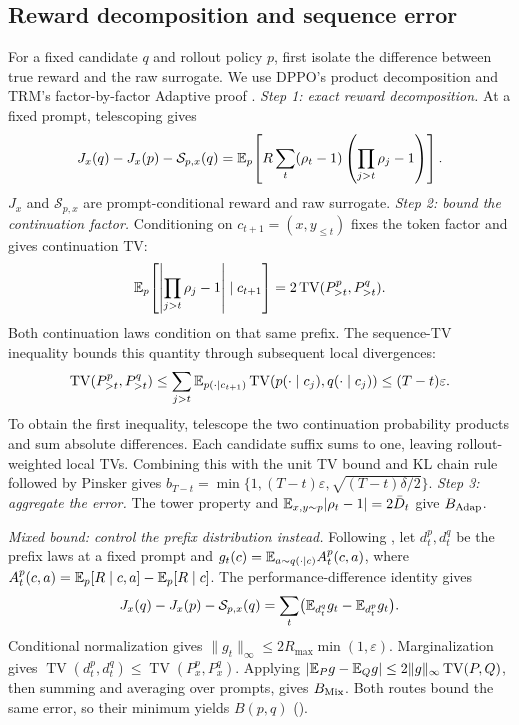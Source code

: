\subsection{Reward decomposition and sequence error}
For a fixed candidate $q$ and rollout policy $p$, first isolate the
difference between true reward and the raw surrogate. We use DPPO's product decomposition
\citep[Appendix~B.1--B.2]{qi2026rethinkingtrustregionllm} and TRM's
factor-by-factor Adaptive proof \citep[Appendix~D]{li2025trm}.
\emph{Step 1: exact reward decomposition.} At a fixed prompt, telescoping gives
\[
 J_x(q)-J_x(p)-\mathcal S_{p,x}(q)
 =\mathbb{E}_p\!\left[R\sum_t(\rho_t-1)
                      \left(\prod_{j>t}\rho_j-1\right)\right].
\]
$J_x$ and $\mathcal S_{p,x}$ are prompt-conditional reward and raw surrogate.
\emph{Step 2: bound the continuation factor.} Conditioning on
$c_{t+1}=(x,y_{\le t})$ fixes the token factor and gives continuation TV:
\[
 \mathbb{E}_p\!\left[\left|\prod_{j>t}\rho_j-1\right|\mid c_{t+1}\right]
 =2\operatorname{TV}(P^p_{>t},P^q_{>t}).
\]
Both continuation laws condition on that same prefix. The sequence-TV
inequality bounds this quantity through subsequent local divergences:
\[
 \operatorname{TV}(P^p_{>t},P^q_{>t})
 \le\sum_{j>t}\mathbb{E}_{p(\cdot\mid c_{t+1})}
       \operatorname{TV}(p(\cdot\mid c_j),q(\cdot\mid c_j))
 \le(T-t)\varepsilon.
\]
To obtain the first inequality, telescope the two continuation probability
products and sum absolute differences. Each candidate suffix sums to one,
leaving rollout-weighted local TVs. Combining this with the unit TV bound
and KL chain rule followed by Pinsker gives
$b_{T-t}=\min\{1,(T-t)\varepsilon,\sqrt{(T-t)\delta/2}\}$.
\emph{Step 3: aggregate the error.} The tower property and
$\mathbb{E}_{x,y\sim p}|\rho_t-1|=2\bar D_t$ give $B_{\rm Adap}$.

\emph{Mixed bound: control the prefix distribution instead.} Following
\citet[Appendix~C.2]{li2025trm}, let $d_t^p,d_t^q$ be the prefix laws at a
fixed prompt and $g_t(c)=\mathbb{E}_{a\sim q(\cdot\mid c)}A_t^p(c,a)$, where
$A_t^p(c,a)=\mathbb{E}_p[R\mid c,a]-\mathbb{E}_p[R\mid c]$.
The performance-difference identity gives
\[
 J_x(q)-J_x(p)-\mathcal S_{p,x}(q)
 =\sum_t\bigl(\mathbb{E}_{d_t^q}g_t-\mathbb{E}_{d_t^p}g_t\bigr).
\]
Conditional normalization gives $\|g_t\|_\infty\le2R_{\max}\min(1,\varepsilon)$.
Marginalization gives $\operatorname{TV}(d_t^p,d_t^q)\le
\operatorname{TV}(P_x^p,P_x^q)$. Applying
$|\mathbb{E}_Pg-\mathbb{E}_Qg|\le2\|g\|_\infty\operatorname{TV}(P,Q)$, then summing and
averaging over prompts, gives $B_{\rm Mix}$. Both routes bound the same
error, so their minimum yields $B(p,q)$ ().

